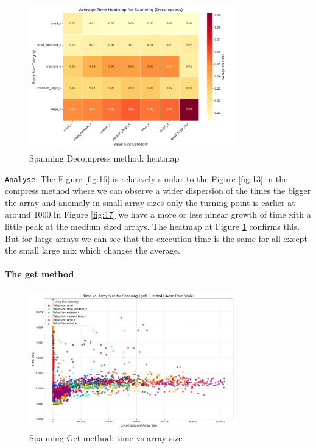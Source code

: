 \documentclass[11pt, a4paper]{article}
\begin{document}
	\begin{figure}[H]%
		\centering
		\includegraphics[width=0.8\textwidth]{Grafics/Spanning/SpanningDecompressHeat.png}
		\caption{Spanning Decompress method: heatmap}
		\label{fig:18}
	\end{figure}
	\texttt{Analyse}: The Figure \ref{fig:16} is relatively similar to the Figure \ref{fig:13} in the compress method where we can observe a wider dispersion of the times the bigger the array and anomaly in small array sizes only the turning point is earlier at around 1000.In Figure \ref{fig:17} we have a more or less ninear growth of time xith a little peak at the medium sized arrays. The heatmap at Figure \ref{fig:18} confirms this. But for large arrays we can see that the execution time is the same for all except the small large mix which changes the average.
	
	\paragraph{The get method}
	\begin{figure}[H]%
		\centering
		\includegraphics[width=0.8\textwidth]{Grafics/Spanning/SpanningGetTimevsSize.png}
		\caption{Spanning Get method: time vs array size}
		\label{fig:19}
		
	\end{figure}
	
\end{document}
